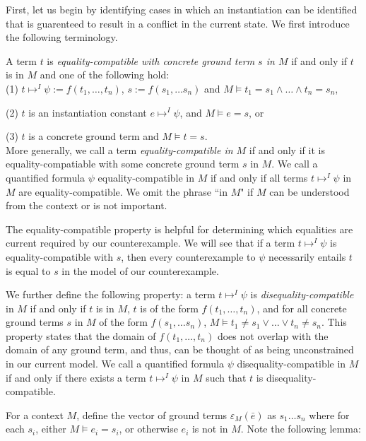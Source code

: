 \documentclass{llncs}
\begin{document}
First, let us begin by identifying cases in which an instantiation can be identified that is guarenteed to result in a conflict in the current state.
We first introduce the following terminology.

A term $t$ is \emph{equality-compatible with concrete ground term $s$ in $M$} if and only if $t$ is in $M$ and one of the following hold:\\

(1) $t \mapsto^I \psi := f( t_1, \ldots, t_n )$, $s := f( s_1, \ldots s_n )$ and $M \models t_1 = s_1 \wedge \ldots \wedge t_n = s_n$,

(2) $t$ is an instantiation constant $e \mapsto^I \psi$, and $M \models e = s$, or

(3) $t$ is a concrete ground term and $M \models t = s$. \\

More generally, we call a term \emph{equality-compatible in $M$} if and only if it is equality-compatiable with some concrete ground term $s$ in $M$.
We call a quantified formula $\psi$ equality-compatible in $M$ if and only if all terms $t \mapsto^I \psi$ in $M$ are equality-compatible.
We omit the phrase ``in $M$" if $M$ can be understood from the context or is not important.

The equality-compatible property is helpful for determining which equalities are current required by our counterexample.
We will see that if a term $t \mapsto^I \psi$ is equality-compatible with $s$, then every counterexample to $\psi$ necessarily entails $t$ is equal to $s$ in the model of our counterexample.

We further define the following property: a term $t \mapsto^I \psi$ is \emph{disequality-compatible} in $M$ if and only if $t$ is in $M$, $t$ is of the form $f( t_1, \ldots, t_n )$, and for all concrete ground terms $s$ in $M$ of the form $f( s_1, \ldots s_n )$, $M \models t_1 \neq s_1 \vee \ldots \vee t_n \neq s_n$.
This property states that the domain of $f( t_1, \ldots, t_n )$ does not overlap with the domain of any ground term, and thus, can be thought of as being unconstrained in our current model.
We call a quantified formula $\psi$ disequality-compatible in $M$ if and only if there exists a term $t \mapsto^I \psi$ in $M$ such that $t$ is disequality-compatible.

For a context $M$, define the vector of ground terms $\varepsilon_M( \bar{e} )$ as $s_1 \ldots s_n$ where for each $s_i$, either $M \models e_i = s_i$, or otherwise $e_i$ is not in $M$.
Note the following lemma:
\end{document}
